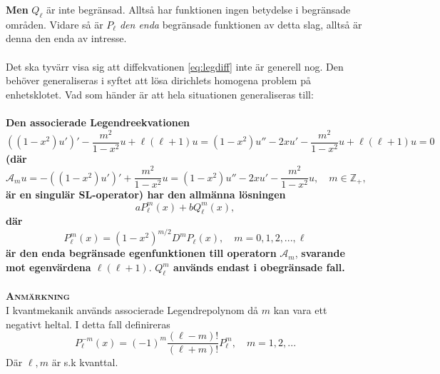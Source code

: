 \documentclass{article}
\begin{document}
\textbf{Men} $Q_{\ell}$ är inte begränsad. Alltså har funktionen ingen betydelse i begränsade områden. Vidare så är $P_{\ell}$ \textit{den enda} begränsade funktionen av detta slag, alltså är denna den enda av intresse.\\ \\
Det ska tyvärr visa sig att diffekvationen \eqref{eq:legdiff} inte är generell nog. Den behöver generaliseras i syftet att lösa dirichlets homogena problem på enhetsklotet. Vad som händer är att hela situationen generaliseras till:\\ \\
\textbf{Den associerade Legendreekvationen}
\begin{equation}\label{eq:asleg}
    ((1-x^2)u')'-\frac{m^2}{1-x^2}u+\ell(\ell+1)u=(1-x^2)u''-2xu'-\frac{m^2}{1-x^2}u+\ell(\ell+1)u=0
\end{equation}
\textbf{(där}
\begin{equation}
  \mathcal{A}_mu=-((1-x^2)u')'+\frac{m^2}{1-x^2}u=(1-x^2)u''-2xu'-\frac{m^2}{1-x^2}u, \quad m\in\mathbb{Z}_+,
\end{equation}
\textbf{är en singulär SL-operator) har den allmänna lösningen}
\begin{equation}\label{eq:alasleg}
  aP_{\ell}^m(x)+bQ_{\ell}^m(x),
\end{equation}
\textbf{där}
\begin{equation}
  P_{\ell}^m(x)=(1-x^2)^{m/2}D^mP_{\ell}(x), \quad m=0,1,2,...,\ell
\end{equation}
\textbf{är den enda begränsade egenfunktionen till operatorn} $\mathcal{A}_m$, \textbf{svarande mot egenvärdena $\ell(\ell+1)$}. \textbf{$Q_{\ell}^m$ används endast i obegränsade fall.}\\ \\
\textbf{\textsc{Anmärkning}}\\
I kvantmekanik används associerade Legendrepolynom då $m$ kan vara ett negativt heltal. I detta fall definireras 
$$
P_{\ell}^{-m}(x)=(-1)^m\frac{(\ell-m)!}{(\ell+m)!}P_{\ell}^m, \quad m=1,2,...
$$
Där $\ell,m$ är s.k kvanttal.
\newpage
\end{document}
